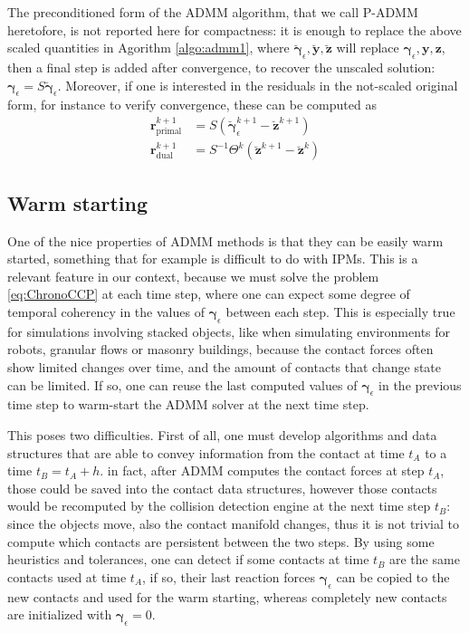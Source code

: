 \documentclass[final,3p]{elsarticle}
\newcommand{\vect}[1]{\bm{#1}}
\begin{document}
The preconditioned form of the ADMM algorithm, that we call P-ADMM heretofore, is not reported here for compactness: it is enough to replace the above scaled quantities in Agorithm \ref{algo:admm1}, where $\breve{\vect{\gamma}}_\epsilon,\breve{\vect{y}},\breve{\vect{z}}$ will replace $\vect{\gamma}_\epsilon, \vect{y}, \vect{z}$, then a final step is added after convergence, to recover the unscaled solution: $\vect{\gamma}_\epsilon = S \breve{\vect{\gamma}}_\epsilon$. Moreover, if one is interested in the residuals in the not-scaled original form, for instance to verify convergence, these can be computed as 
%
\begin{align}
\vect{r}_{\text{primal}}^{k+1} &= S \left( \breve{\vect{\gamma}}_\epsilon^{k+1}-\breve{\vect{z}}^{k+1} \right) \nonumber \\
\vect{r}_{\text{dual}}^{k+1}   &= S^{-1} \Theta^k (\breve{\vect{z}}^{k+1} - \breve{\vect{z}}^{k}) \nonumber
\end{align}


\subsection{Warm starting}

One of the nice properties of ADMM methods is that they can be easily warm started, something that for example is difficult to do with IPMs. 
This is a relevant feature in our context, because we must solve the problem \eqref{eq:ChronoCCP} at each time step, where one can expect some degree of temporal coherency in the values of $\vect{\gamma}_\epsilon$ between each step. This is especially true for simulations involving stacked objects, like when simulating environments for robots, granular flows or masonry buildings, because the contact forces often show limited changes over time, and the amount of contacts that change state can be limited. If so, one can reuse the last computed values of $\vect{\gamma}_\epsilon$ in the previous time step to warm-start the ADMM solver at the next time step.

This poses two difficulties. First of all, one must develop algorithms and data structures that are able to convey information from the contact at time $t_A$ to a time $t_B = t_A+h$. in fact, after ADMM computes the contact forces at step $t_A$, those could be saved into the contact data structures, however those contacts would be recomputed by the collision detection engine at the next time step $t_B$: since the objects move, also the contact manifold changes, thus it is not trivial to compute which contacts are persistent between the two steps. By using some heuristics and tolerances, one can detect if some contacts at time $t_B$ are the same contacts used at time $t_A$, if so, their last reaction forces $\vect{\gamma}_\epsilon$ can be copied to the new contacts and used for the warm starting, whereas completely new contacts are initialized with $\vect{\gamma}_\epsilon = 0$. 
\end{document}

